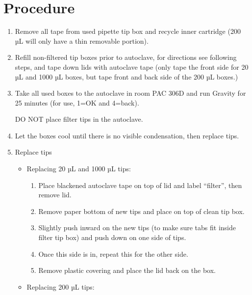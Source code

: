 \documentclass[
  letterpaper,
  DIV=11,
  numbers=noendperiod]{scrreprt}
\providecommand{\tightlist}{%
  \setlength{\itemsep}{0pt}\setlength{\parskip}{0pt}}\usepackage{longtable,booktabs,array}
\begin{document}
\hypertarget{procedure-8}{%
\section{Procedure}\label{procedure-8}}

\begin{enumerate}
\def\labelenumi{\arabic{enumi}.}
\item
  Remove all tape from used pipette tip box and recycle inner cartridge
  (200 µL will only have a thin removable portion).
\item
  Refill non-filtered tip boxes prior to autoclave, for directions see
  following steps, and tape down lids with autoclave tape (only tape the
  front side for 20 µL and 1000 µL boxes, but tape front and back side
  of the 200 µL boxes.)
\item
  Take all used boxes to the autoclave in room PAC 306D and run Gravity
  for 25 minutes (for use, 1=OK and 4=back).

  \begin{tcolorbox}[enhanced jigsaw, toprule=.15mm, breakable, coltitle=black, leftrule=.75mm, title=\textcolor{quarto-callout-important-color}{\faExclamation}\hspace{0.5em}{IMPORTANT}, bottomrule=.15mm, toptitle=1mm, bottomtitle=1mm, colframe=quarto-callout-important-color-frame, opacityback=0, colback=white, opacitybacktitle=0.6, colbacktitle=quarto-callout-important-color!10!white, rightrule=.15mm, titlerule=0mm, arc=.35mm, left=2mm]

  DO NOT place filter tips in the autoclave.

  \end{tcolorbox}
\item
  Let the boxes cool until there is no visible condensation, then
  replace tips.
\item
  Replace tips

  \begin{itemize}
  \item
    Replacing 20 µL and 1000 µL tips:

    \begin{enumerate}
    \def\labelenumii{\arabic{enumii}.}
    \tightlist
    \item
      Place blackened autoclave tape on top of lid and label ``filter'',
      then remove lid.
    \item
      Remove paper bottom of new tips and place on top of clean tip box.
    \item
      Slightly push inward on the new tips (to make sure tabs fit inside
      filter tip box) and push down on one side of tips.
    \item
      Once this side is in, repeat this for the other side.
    \item
      Remove plastic covering and place the lid back on the box.
    \end{enumerate}
  \item
    Replacing 200 µL tips:


\end{itemize}
\end{enumerate}
\end{document}

